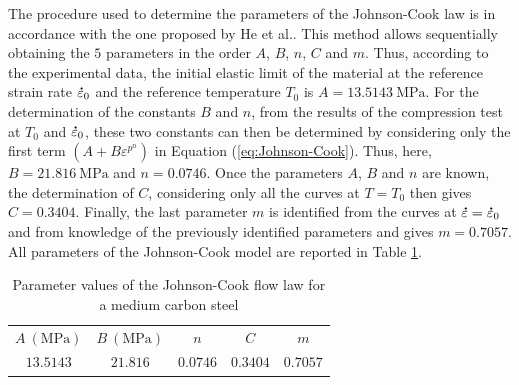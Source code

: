 \documentclass[twoside,english,1p,final,sort&compress]{elsarticle}
\makeatletter
\theoremstyle{plain}
\DeclareRobustCommand{\mdot}[1]{\accentset{\mbox{\bfseries .}}{#1}}
\DeclareRobustCommand{\eal}{et al.\@\xspace}
\DeclareRobustCommand{\MPa}{\text{MPa}}
\makeatother
\begin{document}
The procedure used to determine the parameters of the Johnson-Cook law is in accordance with the one proposed by He \eal \cite{He-2013}.
This method allows sequentially obtaining the $5$ parameters in the order $A$, $B$, $n$, $C$ and $m$.
Thus, according to the experimental data, the initial elastic limit of the material at the reference strain rate $\mdot\varepsilon_0$ and the reference temperature $T_0$ is $A=13.5143~\MPa$.
For the determination of the constants $B$ and $n$, from the results of the compression test at $T_0$ and $\mdot\varepsilon_0$, these two constants can then be determined by considering only the first term $\left(A+B\varepsilon^{p^{n}}\right)$ in Equation (\ref{eq:Johnson-Cook}).
Thus, here, $B=21.816~\MPa$ and $n=0.0746$.
Once the parameters $A$, $B$ and $n$ are known, the determination of $C$, considering only all the curves at $T=T_0$ then gives $C=0.3404$.
Finally, the last parameter $m$ is identified from the curves at $\mdot\varepsilon=\mdot\varepsilon_0$ and from knowledge of the previously identified parameters and gives $m=0.7057$.
All parameters of the Johnson-Cook model are reported in Table \ref{tab:JC}.

\begin{table}[h!]
\centering
\caption{Parameter values of the Johnson-Cook flow law for a medium carbon steel}
\begin{tabular}{ccccc}
	\hline
	$A~(\MPa)$ & $B~(\MPa)$ &   $n$    &   $C$    &   $m$    \\
	$13.5143$  &  $21.816$  & $0.0746$ & $0.3404$ & $0.7057$ \\ \hline
\end{tabular}
\label{tab:JC}
\end{table}
\end{document}
